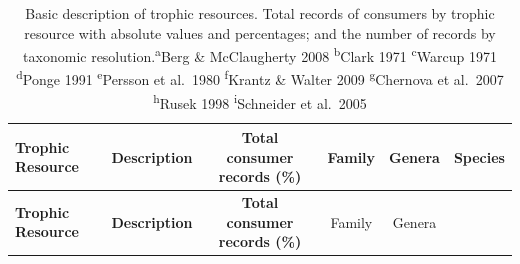 \documentclass[10pt,oneside]{article}
\begin{document}
\begin{longtable}[]{@{}lccccc@{}}
\caption{Basic description of trophic resources. Total records of
consumers by trophic resource with absolute values and percentages; and
the number of records by taxonomic resolution.\textsuperscript{a}Berg \&
McClaugherty 2008 \textsuperscript{b}Clark 1971
\textsuperscript{c}Warcup 1971 \textsuperscript{d}Ponge 1991
\textsuperscript{e}Persson et al.~1980 \textsuperscript{f}Krantz \&
Walter 2009 \textsuperscript{g}Chernova et al.~2007
\textsuperscript{h}Rusek 1998 \textsuperscript{i}Schneider et
al.~2005}\tabularnewline
\toprule
\begin{minipage}[b]{0.11\columnwidth}\raggedright
\textbf{Trophic Resource}\strut
\end{minipage} & \begin{minipage}[b]{0.45\columnwidth}\centering
\textbf{Description}\strut
\end{minipage} & \begin{minipage}[b]{0.14\columnwidth}\centering
\textbf{Total consumer records (\%)}\strut
\end{minipage} & \begin{minipage}[b]{0.04\columnwidth}\centering
Family\strut
\end{minipage} & \begin{minipage}[b]{0.04\columnwidth}\centering
Genera\strut
\end{minipage} & \begin{minipage}[b]{0.04\columnwidth}\centering
Species\strut
\end{minipage}\tabularnewline
\midrule
\endfirsthead
\toprule
\begin{minipage}[b]{0.11\columnwidth}\raggedright
\textbf{Trophic Resource}\strut
\end{minipage} & \begin{minipage}[b]{0.45\columnwidth}\centering
\textbf{Description}\strut
\end{minipage} & \begin{minipage}[b]{0.14\columnwidth}\centering
\textbf{Total consumer records (\%)}\strut
\end{minipage} & \begin{minipage}[b]{0.04\columnwidth}\centering
Family\strut
\end{minipage} & \begin{minipage}[b]{0.04\columnwidth}\centering
Genera\strut
\end{minipage} & \begin{minipage}[b]{0.04\columnwidth}\centering

\end{minipage}
\end{longtable}
\end{document}
